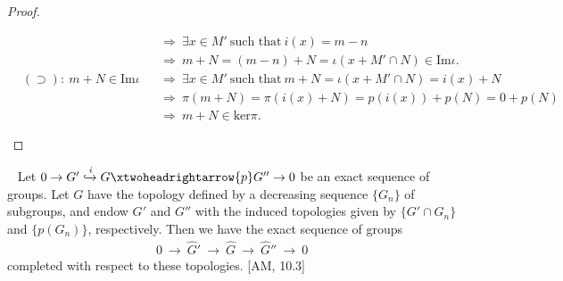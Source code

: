 \documentclass[12pt,a4paper,footinclude=true,headinclude=true]{scrbook} %
\newenvironment{corollary}[2][]
{\renewcommand\theinnercustomcol{#2}\innercustomcol[#1]
\begin{mdframed}[backgroundcolor=gray!20]\ }
{\end{mdframed}\endinnercustomcol}
\begin{document}
\begin{proof}
\begin{itemize}
\begin{align*}
            & & &\Rightarrow\ \exists x\in M'\ \text{such that}\ i(x)=m-n\\
            & & &\Rightarrow\ m+N=(m-n)+N=\iota(x+M'\cap N)\in\mathrm{Im}\iota.\\
            &(\supset):\ m+N\in\mathrm{Im}\iota & &\Rightarrow\ \exists x\in M'\ \text{such that}\ m+N=\iota(x+M'\cap N)=i(x)+N\\
            & & &\Rightarrow\ \pi(m+N)=\pi(i(x)+N)=p(i(x))+p(N)=0+p(N)\\ 
            & & &\Rightarrow\ m+N\in\mathrm{ker}\pi.
        \end{align*}
    \end{itemize}
\end{proof}
\newpage
\begin{corollary}{23}
    Let $0\to G'\xhookrightarrow{i}  G\xtwoheadrightarrow{p} G''\to0$ be an exact sequence of groups. Let $G$ have the topology defined by a decreasing sequence $\{G_n\}$ of subgroups, and endow $G'$ and $G''$ with the induced topologies given by $\{G'\cap G_n\}$ and $\{p(G_n)\}$, respectively. Then we have the exact sequence of groups
    \begin{align*}
        0\ \to\ \widehat{G}'\ \to\ \widehat{G}\ \to\ \widehat{G}''\ \to\ 0
    \end{align*}
    completed with respect to these topologies. [AM, 10.3]
\end{corollary}
\end{document}
